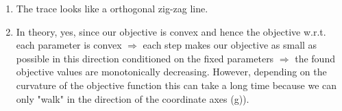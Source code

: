 \documentclass[a4paper]{article}
\makeatletter
\newcommand{\hlnum}[1]{\textcolor[rgb]{0.686,0.059,0.569}{#1}}%
\newcommand{\hlstr}[1]{\textcolor[rgb]{0.192,0.494,0.8}{#1}}%
\newcommand{\hlopt}[1]{\textcolor[rgb]{0,0,0}{#1}}%
\newcommand{\hlstd}[1]{\textcolor[rgb]{0.345,0.345,0.345}{#1}}%
\newcommand{\hlkwb}[1]{\textcolor[rgb]{0.69,0.353,0.396}{#1}}%
\newcommand{\hlkwc}[1]{\textcolor[rgb]{0.333,0.667,0.333}{#1}}%
\newcommand{\hlkwd}[1]{\textcolor[rgb]{0.737,0.353,0.396}{\textbf{#1}}}%
\newenvironment{kframe}{%
 \def\at@end@of@kframe{}%
 \ifinner\ifhmode%
  \def\at@end@of@kframe{\end{minipage}}%
  \begin{minipage}{\columnwidth}%
 \fi\fi%
 \def\FrameCommand##1{\hskip\@totalleftmargin \hskip-\fboxsep
 \colorbox{shadecolor}{##1}\hskip-\fboxsep
     \hskip-\linewidth \hskip-\@totalleftmargin \hskip\columnwidth}%
 \MakeFramed {\advance\hsize-\width
   \@totalleftmargin\z@ \linewidth\hsize
   \@setminipage}}%
 {\par\unskip\endMakeFramed%
 \at@end@of@kframe}
\newenvironment{knitrout}{}{} %
\makeatother
\begin{document}
{\begin{enumerate}
\begin{knitrout}
\begin{kframe}
\begin{alltt}
\hlstd{fxx} \hlkwb{=} \hlkwd{apply}\hlstd{(xx,} \hlnum{1}\hlstd{, f)}
\hlstd{df} \hlkwb{=} \hlkwd{data.frame}\hlstd{(}\hlkwc{xx} \hlstd{= xx,} \hlkwc{fxx} \hlstd{= fxx)}

\hlkwd{ggplot}\hlstd{()} \hlopt{+}
    \hlkwd{geom_contour_filled}\hlstd{(}\hlkwc{data} \hlstd{= df,} \hlkwd{aes}\hlstd{(}\hlkwc{x} \hlstd{= xx.X1,} \hlkwc{y} \hlstd{= xx.X2,} \hlkwc{z} \hlstd{= fxx))} \hlopt{+}
    \hlkwd{xlab}\hlstd{(}\hlkwd{expression}\hlstd{(theta[}\hlnum{1}\hlstd{]))} \hlopt{+}
    \hlkwd{ylab}\hlstd{(}\hlkwd{expression}\hlstd{(theta[}\hlnum{2}\hlstd{]))} \hlopt{+}
    \hlkwd{geom_point}\hlstd{(}\hlkwc{data} \hlstd{=} \hlkwd{as.data.frame}\hlstd{(}\hlkwd{t}\hlstd{(}\hlkwd{c}\hlstd{(t1, t2))),} \hlkwc{mapping} \hlstd{=} \hlkwd{aes}\hlstd{(}\hlkwc{x}\hlstd{=V1,} \hlkwc{y}\hlstd{=V2),}
               \hlkwc{color}\hlstd{=}\hlstr{"red"}\hlstd{)}
\end{alltt}
\end{kframe}
\texttt{[image: figure/univ-mv-1]} 
\end{knitrout}
\item The trace looks like a orthogonal zig-zag line.
\item In theory, yes, since our objective is convex and hence the objective w.r.t. each parameter is convex $\Rightarrow$ each step makes our objective as small as possible in this direction conditioned on the fixed parameters $\Rightarrow$ the found objective values are monotonically decreasing. However, depending on the curvature of the objective function this can take a long time because we can only "walk" in the direction of the coordinate axes (g)). \\

\end{enumerate}
}
\end{document}
